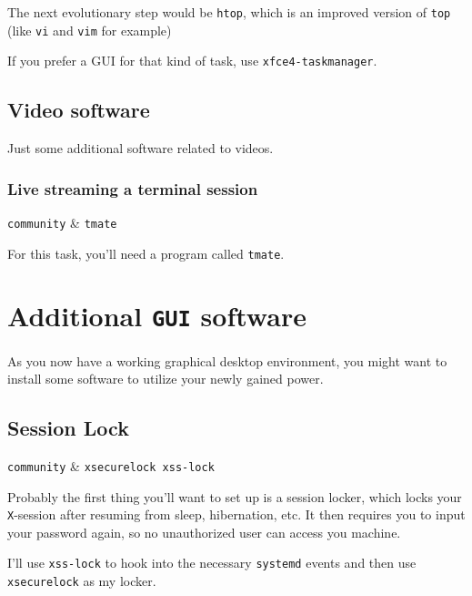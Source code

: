 \documentclass[10pt]{dustdoc}
\begin{document}
The next evolutionary step would be \texttt{htop}, which is an improved version of \texttt{top} (like \texttt{vi} and \texttt{vim} for example)

If you prefer a GUI for that kind of task, use \texttt{xfce4-taskmanager}.

\subsection{Video software}
\label{sec:console-video-software}

Just some additional software related to videos.

\subsubsection{Live streaming a terminal session}
\label{sec:live-streaming-a-terminal-session}

\begin{packagetable}
    \texttt{community} & \texttt{tmate} \\
\end{packagetable}

For this task, you’ll need a program called \texttt{tmate}.

\section{Additional \texttt{GUI} software}
\label{sec:additional-gui-software}

As you now have a working graphical desktop environment, you might want to install some software to utilize your newly gained power.

\subsection{Session Lock}
\label{sec:session-lock}

\begin{packagetable}
    \texttt{community} & \texttt{xsecurelock xss-lock} \\
\end{packagetable}

Probably the first thing you’ll want to set up is a session locker, which locks your \texttt{X}-session after resuming from sleep, hibernation, etc.
It then requires you to input your password again, so no unauthorized user can access you machine.

I’ll use \texttt{xss-lock} to hook into the necessary \texttt{systemd} events and then use \texttt{xsecurelock} as my locker.
\end{document}
